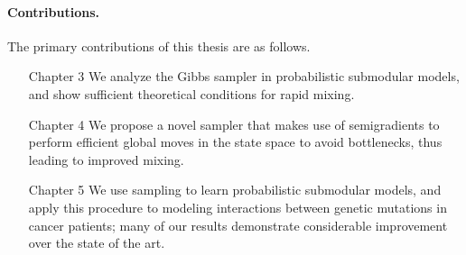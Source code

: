 \paragraph{Contributions.} The primary contributions of this thesis are as follows.
\begin{itemize}[leftmargin=3.5em]
\item[\textsf{Chapter 3}] We analyze the Gibbs sampler in probabilistic submodular models, and show sufficient theoretical conditions for rapid mixing.
\item[\textsf{Chapter 4}] We propose a novel sampler that makes use of semigradients to perform efficient global moves in the state space to avoid bottlenecks, thus leading to improved mixing.
\item[\textsf{Chapter 5}] We use sampling to learn probabilistic submodular models, and apply this procedure to modeling interactions between genetic mutations in cancer patients; many of our results demonstrate considerable improvement over the state of the art.
\end{itemize}

